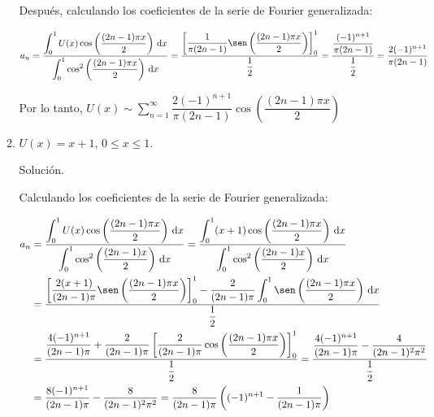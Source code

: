 \documentclass[fleqn]{article}
\newcommand{\integ}[3]{\displaystyle \int_{#1}^{#2} #3 \, \mathrm{d} x}
\begin{document}
\begin{enumerate}[I.]
\begin{enumerate}
            Después, calculando los coeficientes de la serie de Fourier generalizada:

            \begin{align*}
                a_n = \dfrac{\integ{0}{1}{U(x) \cos \left( \dfrac{(2n - 1) \pi x}{2} \right)}}{\integ{0}{1}{\cos^2 \left( \dfrac{(2n- 1) \pi x}{2} \right)}} 
                = \dfrac{\left[ \dfrac{1}{\pi (2n - 1)} \sen \left( \dfrac{(2n - 1) \pi x}{2} \right) \right]_{0}^{1}}{\dfrac{1}{2}} 
                = \dfrac{\dfrac{(-1)^{n+1}}{\pi (2n - 1)}}{\dfrac{1}{2}} 
                = \dfrac{2(-1)^{n+1}}{\pi (2n - 1)}
            \end{align*}

            Por lo tanto, $ U(x) \sim \displaystyle \sum_{n=1}^{\infty} \dfrac{2(-1)^{n+1}}{\pi (2n - 1)} \cos \left( \dfrac{(2n - 1) \pi x}{2} \right) $


			\bfseries
			
			\item $ U(x) = x + 1 $, $ 0 \leq x \leq 1 $.
			
			Solución.
			
			\normalfont

			Calculando los coeficientes de la serie de Fourier generalizada:

            \begin{align*}
                a_n &= \dfrac{\integ{0}{1}{U(x) \cos \left( \dfrac{(2n - 1) \pi x}{2} \right)}}{\integ{0}{1}{\cos^2 \left( \dfrac{(2n - 1) x}{2} \right)}} 
				= \dfrac{\integ{0}{1}{(x + 1) \cos \left( \dfrac{(2n - 1) \pi x}{2} \right)}}{\integ{0}{1}{\cos^2 \left( \dfrac{(2n - 1) x}{2} \right)}} \\
                &= \dfrac{\left[ \dfrac{2(x + 1)}{(2n - 1) \pi} \sen \left( \dfrac{(2n - 1) \pi x}{2} \right) \right]_{0}^{1} - \dfrac{2}{(2n - 1) \pi} \integ{0}{1}{\sen \left( \dfrac{(2n - 1) \pi x}{2} \right)}}{\dfrac{1}{2}} \\
                &= \dfrac{\dfrac{4(-1)^{n+1}}{(2n - 1) \pi} + \dfrac{2}{(2n - 1) \pi} \left[ \dfrac{2}{(2n - 1) \pi} \cos \left( \dfrac{(2n - 1) \pi x}{2} \right) \right]_{0}^{1}}{\dfrac{1}{2}} 
                = \dfrac{\dfrac{4(-1)^{n+1}}{(2n - 1) \pi} - \dfrac{4}{(2n - 1)^2 \pi^2}}{\dfrac{1}{2}} \\
                &= \dfrac{8(-1)^{n+1}}{(2n - 1) \pi} - \dfrac{8}{(2n - 1)^2 \pi^2}
                = \dfrac{8}{(2n - 1) \pi} \left( (-1)^{n+1} - \dfrac{1}{(2n - 1) \pi} \right)
            \end{align*}


\end{enumerate}
\end{enumerate}
\end{document}
